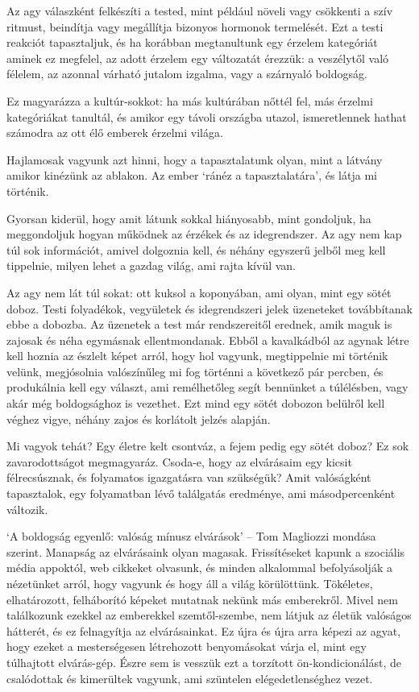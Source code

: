 Az agy válaszként felkészíti a tested, mint például növeli vagy
csökkenti a szív ritmust, beindítja vagy megállítja bizonyos hormonok
termelését. Ezt a testi reakciót tapasztaljuk, és ha korábban
megtanultunk egy érzelem kategóriát aminek ez megfelel, az adott érzelem
egy változatát érezzük: a veszélytől való félelem, az azonnal várható
jutalom izgalma, vagy a szárnyaló boldogság.

Ez magyarázza a kultúr-sokkot: ha más kultúrában nőttél fel, más érzelmi
kategóriákat tanultál, és amikor egy távoli országba utazol,
ismeretlennek hathat számodra az ott élő emberek érzelmi világa.

Hajlamosak vagyunk azt hinni, hogy a tapasztalatunk olyan, mint a
látvány amikor kinézünk az ablakon. Az ember `ránéz a tapasztalatára',
és látja mi történik.

Gyorsan kiderül, hogy amit látunk sokkal hiányosabb, mint gondoljuk, ha
meggondoljuk hogyan működnek az érzékek és az idegrendszer. Az agy nem
kap túl sok információt, amivel dolgoznia kell, és néhány egyszerű
jelből meg kell tippelnie, milyen lehet a gazdag világ, ami rajta kívül
van.

Az agy nem lát túl sokat: ott kuksol a koponyában, ami olyan, mint egy
sötét doboz. Testi folyadékok, vegyületek és idegrendszeri jelek
üzeneteket továbbítanak ebbe a dobozba. Az üzenetek a test már
rendszereitől erednek, amik maguk is zajosak és néha egymásnak
ellentmondanak. Ebből a kavalkádból az agynak létre kell hoznia az
észlelt képet arról, hogy hol vagyunk, megtippelnie mi történik velünk,
megjósolnia valószínűleg mi fog történni a következő pár percben, és
produkálnia kell egy választ, ami remélhetőleg segít bennünket a
túlélésben, vagy akár még boldogsághoz is vezethet. Ezt mind egy sötét
dobozon belülről kell véghez vigye, néhány zajos és korlátolt jelzés
alapján.

\clearpage

Mi vagyok tehát? Egy életre kelt csontváz, a fejem pedig egy sötét
doboz? Ez sok zavarodottságot megmagyaráz. Csoda-e, hogy az elvárásaim
egy kicsit félrecsúsznak, és folyamatos igazgatásra van szükségük? Amit
valóságként tapasztalok, egy folyamatban lévő találgatás eredménye, ami
másodpercenként változik.

`A boldogság egyenlő: valóság mínusz elvárások' -- Tom Magliozzi mondása
szerint. Manapság az elvárásaink olyan magasak. Frissítéseket kapunk a
szociális média appoktól, web cikkeket olvasunk, és minden alkalommal
befolyásolják a nézetünket arról, hogy vagyunk és hogy áll a világ
körülöttünk. Tökéletes, elhatározott, felháborító képeket mutatnak
nekünk más emberekről. Mivel nem találkozunk ezekkel az emberekkel
szemtől-szembe, nem látjuk az életük valóságos hátterét, és ez
felnagyítja az elvárásainkat. Ez újra és újra arra képezi az agyat, hogy
ezeket a mesterségesen létrehozott benyomásokat várja el, mint egy
túlhajtott elvárás-gép. Észre sem is vesszük ezt a torzított
ön-kondicionálást, de csalódottak és kimerültek vagyunk, ami szüntelen
elégedetlenséghez vezet.

